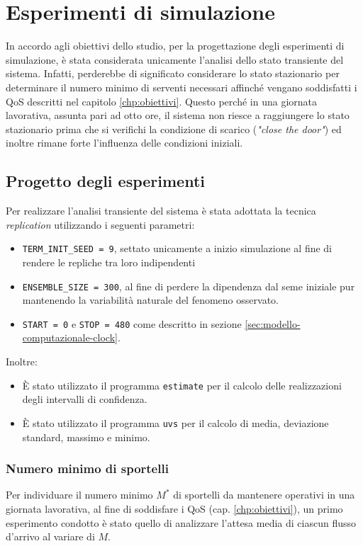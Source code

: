 \chapter{Esperimenti di simulazione}\label{chp:esperimenti-simulazione}
In accordo agli obiettivi dello studio, per la progettazione degli esperimenti di simulazione, è stata considerata unicamente l'analisi dello stato transiente del sistema. Infatti, perderebbe di significato considerare lo stato stazionario per determinare il numero minimo di serventi necessari affinché vengano soddisfatti i QoS descritti nel capitolo \ref{chp:obiettivi}. Questo perché in una giornata lavorativa, assunta pari ad otto ore, il sistema non riesce a raggiungere lo stato stazionario prima che si verifichi la condizione di scarico (\textit{"close the door"}) ed inoltre rimane forte l'influenza delle condizioni iniziali.

\section{Progetto degli esperimenti}
Per realizzare l'analisi transiente del sistema è stata adottata la tecnica \textit{replication} utilizzando i seguenti parametri:
\begin{itemize}
\item \texttt{TERM\_INIT\_SEED = 9}, settato unicamente a inizio simulazione al fine di rendere le repliche tra loro indipendenti 
\item \texttt{ENSEMBLE\_SIZE = 300}, al fine di perdere la dipendenza dal seme iniziale pur mantenendo la variabilità naturale del fenomeno osservato.
\item \texttt{START = 0} e \texttt{STOP = 480} come descritto in sezione \ref{sec:modello-computazionale-clock}.
\end{itemize}

Inoltre:
\begin{itemize}
\item È stato utilizzato il programma \texttt{estimate} per il calcolo delle realizzazioni degli intervalli di confidenza.
\item È stato utilizzato il programma \texttt{uvs} per il calcolo di media, deviazione standard, massimo e minimo.
\end{itemize}

\subsection*{Numero minimo di sportelli}
Per individuare il numero minimo $M^*$ di sportelli da mantenere operativi in una giornata lavorativa, al fine di soddisfare i QoS (cap. \ref{chp:obiettivi}), un primo esperimento condotto è stato quello di analizzare l'attesa media di ciascun flusso d'arrivo al variare di $M$.

